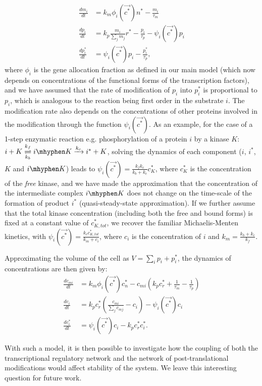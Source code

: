 \documentclass[10pt]{article}
\begin{document}
\begin{align}
    \frac{dm_i}{dt} &= k_m \phi_i(\vec{c^*})n^* - \frac{m_i}{\tau_m} \\
    \frac{dp_i}{dt} &= k_p \frac{m_i}{\sum_j m_j} r^* - \frac{p_i}{\tau_p} - \psi_i(\vec{c^*}) p_i \\
    \frac{dp^*_i}{dt} &= \psi_i(\vec{c^*}) p_i - \frac{p^*_i}{\tau_p}, 
    \label{eqn:dynamicsPTM_numbers}
\end{align}
where $\phi_i$ is the gene allocation fraction as defined in our main model (which now depends on concentrations of the functional forms of the transcription factors), and we have assumed that the rate of modification of $p_i$ into $p^*_i$ is proportional to $p_i$, which is analogous to the reaction being first order in the substrate $i$. The modification rate also depends on the concentrations of other proteins involved in the modification through the function $\psi_i(\vec{c^*})$. As an example, for the case of a 1-step enzymatic reaction e.g. phosphorylation of a protein $i$ by a kinase $K$: $i + K \underset{k_b}{\stackrel{k_f}{\rightleftharpoons}} i\mhyphen K \xrightarrow{k_c} i^* + K$, solving the dynamics of each component ($i$, $i^*$, $K$ and $i\mhyphen K$) leads to $\psi_i(\vec{c^*}) = \frac{k_f k_c}{k_b+k_c} c^*_K$, where $c^*_K$ is the concentration of the \textit{free} kinase, and we have made the approximation that the concentration of the intermediate complex $i\mhyphen K$ does not change on the time-scale of the formation of product $i^*$ (quasi-steady-state approximation). If we further assume that the total kinase concentration (including both the free and bound forms) is fixed at a constant value of $c^*_{K,tot}$, we recover the familiar Michaelis-Menten kinetics, with $\psi_i(\vec{c^*}) = \frac{k_c c^*_{K,tot}}{k_m + c_i}$, where $c_i$ is the concentration of $i$ and $k_m = \frac{k_b + k_c}{k_f}$.

Approximating the volume of the cell as $V = \sum_i p_i + p^*_i$, the dynamics of concentrations are then given by:
\begin{align}
    \frac{dc_{mi}}{dt} &= k_m \phi_i(\vec{c^*})c_n^* - c_{mi} \left(k_p c^*_r + \frac{1}{\tau_m} - \frac{1}{\tau_p} \right)   \\
    \frac{dc_i}{dt} &= k_p c^*_r \left( \frac{c_{mi}}{\sum_j c_{mj}} - c_i \right) -  \psi_i(\vec{c^*}) c_i \\
    \frac{dc^*_i}{dt} &= \psi_i(\vec{c^*}) c_i - k_p c^*_r c^*_i. 
    \label{eqn:dynamicsPTM_concs}
\end{align}

With such a model, it is then possible to investigate how the coupling of both the transcriptional regulatory network and the network of post-translational modifications would affect stability of the system. We leave this interesting question for future work. 
    
%
%
\end{document}

